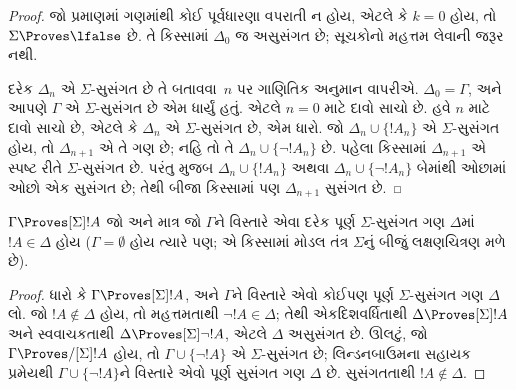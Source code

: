 \begin{proof}
જો પ્રમાણમાં ગણમાંથી કોઈ પૂર્વધારણા વપરાતી ન હોય, એટલે કે
$k=0$ હોય, તો $\Sigma \Proves \lfalse$ છે. તે કિસ્સામાં
$\Delta_0$ જ અસુસંગત છે; સૂચકોનો મહત્તમ લેવાની જરૂર નથી.

દરેક $\Delta_n$ એ $\Sigma$-સુસંગત છે તે બતાવવા~$n$ પર ગાણિતિક અનુમાન
વાપરીએ. $\Delta_0 = \Gamma$, અને આપણે $\Gamma$ એ
$\Sigma$-સુસંગત છે એમ ધાર્યું હતું. એટલે $n = 0$ માટે દાવો સાચો
છે. હવે $n$ માટે દાવો સાચો છે, એટલે કે $\Delta_n$ એ
$\Sigma$-સુસંગત છે, એમ ધારો. જો $\Delta_n \cup \{!A_n\}$ એ
$\Sigma$-સુસંગત હોય, તો $\Delta_{n+1}$ એ તે ગણ છે; નહિ તો તે
$\Delta_n \cup \{\lnot!A_n\}$ છે. પહેલા કિસ્સામાં
$\Delta_{n+1}$ એ સ્પષ્ટ રીતે $\Sigma$-સુસંગત છે. પરંતુ
મુજબ $\Delta_n \cup \{!A_n\}$ અથવા $\Delta_n \cup \{\lnot!A_n\}$
બેમાંથી ઓછામાં ઓછો એક સુસંગત છે; તેથી બીજા કિસ્સામાં પણ
$\Delta_{n+1}$ સુસંગત છે.
\end{proof}


\begin{cor}
  $\Gamma \Proves[\Sigma] !A$ જો અને માત્ર જો $\Gamma$ને વિસ્તારે
  એવા દરેક પૂર્ણ $\Sigma$-સુસંગત ગણ $\Delta$માં $!A \in \Delta$
  હોય ($\Gamma = \emptyset$ હોય ત્યારે પણ; એ કિસ્સામાં મોડલ તંત્ર
  $\Sigma$નું બીજું લક્ષણચિત્રણ મળે છે).
\end{cor}

\begin{proof}
  ધારો કે $\Gamma \Proves[\Sigma] !A$, અને $\Gamma$ને વિસ્તારે
  એવો કોઈપણ પૂર્ણ $\Sigma$-સુસંગત ગણ $\Delta$ લો. જો $!A
  \notin \Delta$ હોય, તો મહત્તમતાથી $\lnot!A \in \Delta$;
  તેથી એકદિશવર્ધિતાથી $\Delta \Proves[\Sigma] !A$ અને સ્વવાચકતાથી
  $\Delta \Proves[\Sigma] \lnot!A$, એટલે $\Delta$ અસુસંગત છે.
  ઊલટું, જો $\Gamma \Proves/[\Sigma] !A$ હોય, તો $\Gamma \cup \{
  \lnot!A\}$ એ $\Sigma$-સુસંગત છે; લિન્ડનબાઉમના સહાયક પ્રમેયથી
  $\Gamma \cup \{ \lnot!A \}$ને વિસ્તારે એવો પૂર્ણ સુસંગત ગણ
  $\Delta$ છે. સુસંગતતાથી $!A \notin \Delta$.
\end{proof}
\endgroup

\begingroup
\makeatletter{}\makeatother


